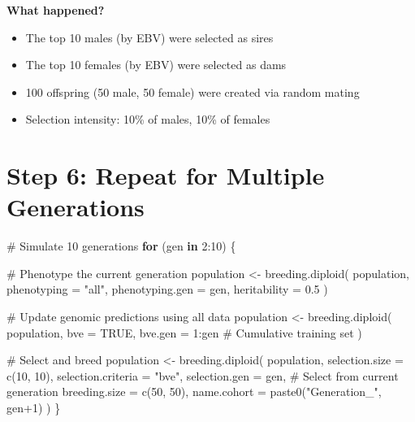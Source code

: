 \documentclass[
  letterpaper,
]{book}
\newenvironment{Shaded}{\begin{snugshade}}{\end{snugshade}}
\newcommand{\AttributeTok}[1]{\textcolor[rgb]{0.40,0.45,0.13}{#1}}
\newcommand{\CommentTok}[1]{\textcolor[rgb]{0.37,0.37,0.37}{#1}}
\newcommand{\ConstantTok}[1]{\textcolor[rgb]{0.56,0.35,0.01}{#1}}
\newcommand{\ControlFlowTok}[1]{\textcolor[rgb]{0.00,0.23,0.31}{\textbf{#1}}}
\newcommand{\DecValTok}[1]{\textcolor[rgb]{0.68,0.00,0.00}{#1}}
\newcommand{\FloatTok}[1]{\textcolor[rgb]{0.68,0.00,0.00}{#1}}
\newcommand{\FunctionTok}[1]{\textcolor[rgb]{0.28,0.35,0.67}{#1}}
\newcommand{\NormalTok}[1]{\textcolor[rgb]{0.00,0.23,0.31}{#1}}
\newcommand{\OtherTok}[1]{\textcolor[rgb]{0.00,0.23,0.31}{#1}}
\newcommand{\SpecialCharTok}[1]{\textcolor[rgb]{0.37,0.37,0.37}{#1}}
\newcommand{\StringTok}[1]{\textcolor[rgb]{0.13,0.47,0.30}{#1}}
\providecommand{\tightlist}{%
  \setlength{\itemsep}{0pt}\setlength{\parskip}{0pt}}
\begin{document}
\textbf{What happened?}

\begin{itemize}
\tightlist
\item
  The top 10 males (by EBV) were selected as sires
\item
  The top 10 females (by EBV) were selected as dams
\item
  100 offspring (50 male, 50 female) were created via random mating
\item
  Selection intensity: 10\% of males, 10\% of females
\end{itemize}

\section{Step 6: Repeat for Multiple Generations}\label{sec-repeat}

\begin{Shaded}
\begin{Highlighting}[]
\CommentTok{\# Simulate 10 generations}
\ControlFlowTok{for}\NormalTok{ (gen }\ControlFlowTok{in} \DecValTok{2}\SpecialCharTok{:}\DecValTok{10}\NormalTok{) \{}

  \CommentTok{\# Phenotype the current generation}
\NormalTok{  population }\OtherTok{\textless{}{-}} \FunctionTok{breeding.diploid}\NormalTok{(}
\NormalTok{    population,}
    \AttributeTok{phenotyping =} \StringTok{"all"}\NormalTok{,}
    \AttributeTok{phenotyping.gen =}\NormalTok{ gen,}
    \AttributeTok{heritability =} \FloatTok{0.5}
\NormalTok{  )}

  \CommentTok{\# Update genomic predictions using all data}
\NormalTok{  population }\OtherTok{\textless{}{-}} \FunctionTok{breeding.diploid}\NormalTok{(}
\NormalTok{    population,}
    \AttributeTok{bve =} \ConstantTok{TRUE}\NormalTok{,}
    \AttributeTok{bve.gen =} \DecValTok{1}\SpecialCharTok{:}\NormalTok{gen                   }\CommentTok{\# Cumulative training set}
\NormalTok{  )}

  \CommentTok{\# Select and breed}
\NormalTok{  population }\OtherTok{\textless{}{-}} \FunctionTok{breeding.diploid}\NormalTok{(}
\NormalTok{    population,}
    \AttributeTok{selection.size =} \FunctionTok{c}\NormalTok{(}\DecValTok{10}\NormalTok{, }\DecValTok{10}\NormalTok{),}
    \AttributeTok{selection.criteria =} \StringTok{"bve"}\NormalTok{,}
    \AttributeTok{selection.gen =}\NormalTok{ gen,               }\CommentTok{\# Select from current generation}
    \AttributeTok{breeding.size =} \FunctionTok{c}\NormalTok{(}\DecValTok{50}\NormalTok{, }\DecValTok{50}\NormalTok{),}
    \AttributeTok{name.cohort =} \FunctionTok{paste0}\NormalTok{(}\StringTok{"Generation\_"}\NormalTok{, gen}\SpecialCharTok{+}\DecValTok{1}\NormalTok{)}
\NormalTok{  )}
\NormalTok{\}}
\end{Highlighting}
\end{Shaded}
\end{document}
